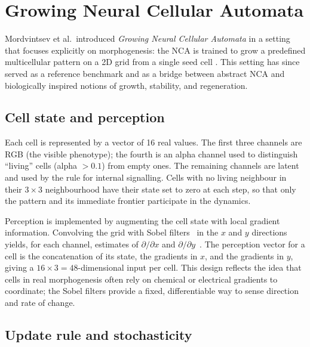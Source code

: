 \section{Growing Neural Cellular Automata}
\label{sec:sota:growing}

Mordvintsev et al.\ introduced \emph{Growing Neural Cellular Automata} in a setting that focuses explicitly on morphogenesis: the NCA is trained to grow a predefined multicellular pattern on a 2D grid from a single seed cell \cite{nca_mordvintsev2020}. This setting has since served as a reference benchmark and as a bridge between abstract NCA and biologically inspired notions of growth, stability, and regeneration.

\subsection{Cell state and perception}

Each cell is represented by a vector of 16 real values. The first three channels are RGB (the visible phenotype); the fourth is an alpha channel used to distinguish ``living'' cells (alpha \(> 0.1\)) from empty ones. The remaining channels are latent and used by the rule for internal signalling. Cells with no living neighbour in their \(3\times 3\) neighbourhood have their state set to zero at each step, so that only the pattern and its immediate frontier participate in the dynamics.

Perception is implemented by augmenting the cell state with local gradient information. Convolving the grid with Sobel filters~\cite{sobel1968isotropic} in the \(x\) and \(y\) directions yields, for each channel, estimates of \(\partial/\partial x\) and \(\partial/\partial y\)~\cite{szeliski2022computer}. The perception vector for a cell is the concatenation of its state, the gradients in \(x\), and the gradients in \(y\), giving a \(16 \times 3 = 48\)-dimensional input per cell. This design reflects the idea that cells in real morphogenesis often rely on chemical or electrical gradients to coordinate; the Sobel filters provide a fixed, differentiable way to sense direction and rate of change.

\subsection{Update rule and stochasticity}

